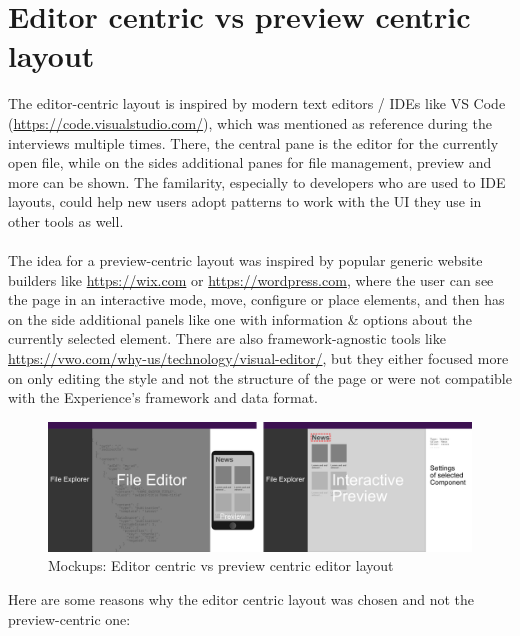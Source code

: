 \section{Editor centric vs preview centric layout}
The editor-centric layout is inspired by modern text editors / IDEs like VS Code (\url{https://code.visualstudio.com/}), which was mentioned as reference during the interviews multiple times.
There, the central pane is the editor for the currently open file, while on the sides additional panes for file management, preview and more can be shown.
The familarity, especially to developers who are used to IDE layouts, could help new users adopt patterns to work with the UI they use in other tools as well.
\\\\
The idea for a preview-centric layout was inspired by popular generic website builders like \url{https://wix.com} or \url{https://wordpress.com}, where the user
can see the page in an interactive mode, move, configure or place elements, and then has on the side additional panels like one with information \& options about the
currently selected element.
There are also framework-agnostic tools like \url{https://vwo.com/why-us/technology/visual-editor/}, but they either focused more on only editing the style and not the structure of the page or were not
compatible with the Experience's framework and data format. 
\begin{figure}[h]
  \includegraphics[width=\textwidth]{pics/editor_centric_vs_preview_centric.png}
  \caption{Mockups: Editor centric vs preview centric editor layout}
\end{figure}
Here are some reasons why the editor centric layout was chosen and not the preview-centric one:
